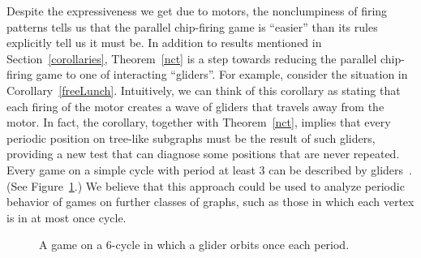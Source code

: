 Despite the expressiveness we get due to motors, the nonclumpiness of firing
patterns tells us that the parallel chip-firing game is ``easier'' than its
rules explicitly tell us it must be. In addition to results mentioned in
Section~\ref{corollaries}, Theorem~\ref{nct} is a step towards reducing the
parallel chip-firing game to one of interacting ``gliders''. For example,
consider the situation in Corollary~\ref{freeLunch}. Intuitively, we can think
of this corollary as stating that each firing of the motor creates a wave of
gliders that travels away from the motor. In fact, the corollary, together with
Theorem~\ref{nct}, implies that every periodic position on tree-like subgraphs
must be the result of such gliders, providing a new test that can diagnose some
positions that are never repeated. Every game on a simple cycle with period at
least 3 can be described by gliders~\cite{cycle}. (See Figure~\ref{cycleFig}.)
We believe that this approach could be used to analyze periodic behavior of
games on further classes of graphs, such as those in which each vertex is in at
most once cycle.

\begin{centering}
  \begin{figure}[tbh]
    \caption{A game on a 6-cycle in which a glider orbits once each period.}
    \label{cycleFig}
  \end{figure}
\end{centering}

